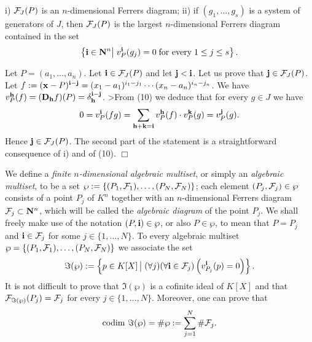 \begin{prop}
i) ${\cal F}_J(P)$ is an $n$-dimensional Ferrers diagram;  ii)  if 
$(g_1,\ldots ,g_s)$ is a system of generators of $J$, then 
${\cal F}_J(P)$ is the largest $n$-dimensional 
Ferrers diagram  contained  in  the 
set 
$$
 \left\{{\bf i}\in  {\bf  N}^n\big|\;
v^{\bf i}_P(g_j)=0
\;  \mbox{for every}\; 1\leq j\leq s \right\}. 
$$
\end{prop}

\prova 
Let $P=(a_1,\ldots,a_n)$. Let ${\bf i}\in {\cal F}_J(P)$ and let 
${\bf j}<{\bf i}$. Let us prove that ${\bf j}\in {\cal F}_J(P)$. 
Let $f:=({\bf x}-P)^{{\bf i}-{\bf j}}= 
(x_1-a_1)^{i_1-j_1}\cdots (x_n-a_n)^{i_n-j_n}$. We have 
$v^{\bf h}_P(f)=({\bf D_h}f)(P)=\delta^{{\bf i}-{\bf j}}_{\bf h}$. 
>From (10) we deduce that for every $g\in J$ we have 
$$
0=v^{\bf i}_P(fg)=
\sum_{{\bf h}+{\bf  k}={\bf  i}} 
v^{\bf h}_P(f) \cdot v^{\bf k}_P(g)= 
v^{\bf j}_P(g).
$$
Hence ${\bf j}\in {\cal F}_J(P)$. 
The second part of the statement is a straightforward  consequence 
of i) and of (10). \hfill $\Box$


We define a {\em  finite  $n$-dimensional  algebraic  multiset},  or 
simply an  {\em  algebraic multiset}, to be  a set
$\wp  :=\{(P_1,{\cal   F}_1),\ldots  ,(P_N,{\cal   F}_N)\}$;  each 
element $(P_j,{\cal   F}_j)\in \wp$ consists of a point $P_j$ of  $K^n$ 
together with an $n$-dimensional 
Ferrers diagram ${\cal   F}_j\subset  {\bf  N}^n$, 
which will be called the {\em  algebraic  diagram}  of  the  point 
$P_j$. We shall freely make use of the notation $(P,{\bf i})\in  \wp$,  or 
also $P\in \wp$, to mean that $P=P_j$ and ${\bf i}\in {\cal F}_j$
for  some  $j\in \{1,\ldots,N\}$. To every algebraic multiset
$\wp  =\{(P_1,{\cal    F}_1),\ldots   ,(P_N,{\cal    F}_N)\}$   we 
associate the set 
$$
\Im(\wp):=\left\{ p\in K[X]\,\big|
\;(\forall j)(\forall {\bf i}\in {\cal F}_j)\left(
v^{\bf i}_{P_j}(p)=0\right)\right\}.
$$
It is not difficult to prove that $\Im(\wp)$ is a  cofinite  ideal 
of  $K[X]$  and  that  ${\cal  F}_{\Im(\wp)}(P_j)={\cal  F}_j$ 
for every $j\in \{1,\ldots,N\}$. Moreover, one can prove that 
$$
{\rm codim} \ \Im(\wp)=\#\wp:=\sum_{j=1}^N\#{\cal  F}_j .
$$ 

